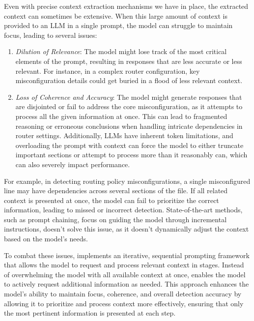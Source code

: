 Even with precise context extraction mechanisms we have in place, the extracted context can sometimes be extensive. When this large amount of context is provided to an LLM in a single prompt, the model can struggle to maintain focus, leading to several issues:
\begin{enumerate}
    \item \textit{Dilution of Relevance}: The model might lose track of the most critical elements of the prompt, resulting in responses that are less accurate or less relevant. For instance, in a complex router configuration, key misconfiguration details could get buried in a flood of less relevant context.
    \item \textit{Loss of Coherence and Accuracy}: The model might generate responses that are disjointed or fail to address the core misconfiguration, as it attempts to process all the given information at once. This can lead to fragmented reasoning or erroneous conclusions when handling intricate dependencies in router settings. Additionally, LLMs have inherent token limitations, and overloading the prompt with context can force the model to either truncate important sections or attempt to process more than it reasonably can, which can also severely impact performance.
\end{enumerate}

For example, in detecting routing policy misconfigurations, a single misconfigured line may have dependencies across several sections of the file. If all related context is presented at once, the model can fail to prioritize the correct information, leading to missed or incorrect detection. State-of-the-art methods, such as prompt chaining, focus on guiding the model through incremental instructions, doesn't solve this issue, as it doesn't dynamically adjust the context based on the model's needs.


To combat these issues, \sysname{} implements an iterative, sequential prompting framework that allows the model to request and process relevant context in stages. Instead of overwhelming the model with all available context at once, \sysname{} enables the model to actively request additional information as needed. This approach enhances the model’s ability to maintain focus, coherence, and overall detection accuracy by allowing it to prioritize and process context more effectively, ensuring that only the most pertinent information is presented at each step.

